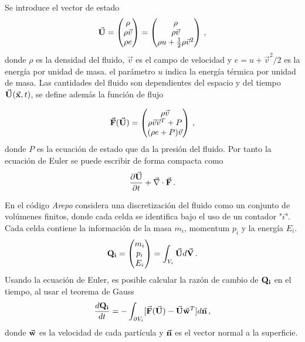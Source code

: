 Se introduce el vector de estado    
\begin{align}
    \vec{\bf{U}}= \begin{pmatrix} \rho \\ \rho\vec{v} \\ \rho e \end{pmatrix} = 
    \begin{pmatrix} \rho \\ \rho\vec{v} \\ \rho u+\frac{1}{2}\rho\vec{v}^{2} \end{pmatrix}\,,
\end{align}
donde $\rho$ es la densidad del fluido, $\vec{v}$ es el campo de velocidad y $e=u+ \vec{v}^{2}/2$ es la energía por unidad de masa. el parámetro $u$ indica la energía térmica por unidad de masa. Las cantidades del fluido son dependientes del espacio y del tiempo $\vec{\bf{U}}(\vec{\bf{x}},t)$, se define además la función de flujo

\begin{align}
    \vec{\bf{F}}(\vec{\bf{U}})=
    \begin{pmatrix} \rho\vec{v} \\ \rho\vec{v}\vec{v}^{T}+ P \\ (\rho e + P)\vec{v} \end{pmatrix}\,,
\end{align}
donde $P$ es la ecuación de estado que da la presión del fluido. Por tanto  la ecuación de Euler se puede escribir de forma compacta como 
\begin{align}
    \frac{\partial\vec{\bf{U}}}{\partial t} + \vec{\nabla}\cdot \vec{\bf{F}}\,.
\end{align}

En el código {\it{Arepo}}  considera una discretización del fluido como un conjunto de volúmenes finitos, donde cada celda se identifica bajo el uso de un contador "$i$". Cada celda contiene la información de la masa $m_{i}$, momentum $p_{i}$ y la energía $E_{i}$. %
\begin{align}
    {\bf{Q}_{i}} = \begin{pmatrix} m_{i} \\ p_{i} \\ E_{i} \end{pmatrix} = \int_{V_{i}} \vec{\bf{U}}d\vec{\bf{V}}\,.
\end{align}
%
Usando la ecuación de Euler, es posible calcular la razón de cambio de ${\bf{Q}_{i}}$ en el tiempo, al usar el teorema de Gauss
\begin{align}
    \frac{d{\bf{Q_{i}}}}{dt} = -\int_{\partial V_{i}}[\vec{\bf{F}}(\vec{\bf{U}})-\vec{\bf{U}}\vec{\bf{w}}^{T}]d\vec{\bf{n}}\,,
\end{align}
donde $\vec{\bf{w}}$ es la velocidad de cada partícula y $\vec{\bf{n}}$ es el vector normal a la superficie.

